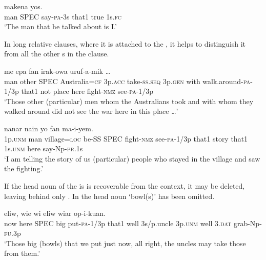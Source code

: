 \ea%
\label{ex:3:x1681}
 makena yos. \\
man SPEC say-\textsc{pa}-3s that1 true 1s.\textsc{fc}\\
\glt`The man that he talked about is I.'
\z

In long relative clauses, where it is attached to the , it helps to distinguish it from all the other s in the clause. 

\ea%
\label{ex:3:x1815}
\gll [\textstyleEmphasizedVernacularWords{Mua} \textstyleEmphasizedVernacularWords{papako} \textstyleEmphasizedVernacularWords{ena} Australia=ke wia aaw-ep wiena feekiya yiaw-e-mik nain] me epa fan irak-owa uruf-a-mik {\dots}\\
man other SPEC Australia=\textsc{cf} 3p.\textsc{acc} take-\textsc{ss}.\textsc{seq} 3p.\textsc{gen} with walk.around-\textsc{pa}-1/3p that1 not place here fight-\textsc{nmz} see-\textsc{pa}-1/3p\\
\glt`Those other (particular) men whom the Australians took and with whom they walked around did not see the war here in this place {\dots}'
\z

\ea%
\label{ex:3:x1683}
\gll [\textstyleEmphasizedVernacularWords{I} mua owowa=pa ik-ok \textstyleEmphasizedVernacularWords{ena} irakowa uruf-a-mik nain] nanar nain yo fan ma-i-yem.\\
1p.\textsc{unm} man village=\textsc{loc} be-SS SPEC fight-\textsc{nmz} see-\textsc{pa}-1/3p that1 story that1 1s.\textsc{unm} here say-Np-\textsc{pr}.1s\\
\glt`I am telling the story of us (particular) people who stayed in the village and saw the fighting.'
\z

If the head noun of the  is is recoverable from the context, it may be deleted, leaving behind only . In  the head noun  `bowl(s)' has been omitted.

\ea%
\label{ex:3:x1682}
 eliw, wie wi eliw wiar op-i-kuan.\\
now here SPEC big put-\textsc{pa}-1/3p that1 well 3s/p.uncle 3p.\textsc{unm} well 3.\textsc{dat} grab-Np-\textsc{fu}.3p\\
\glt`Those big (bowls) that we put just now, all right, the uncles may take those from them.'
\z

